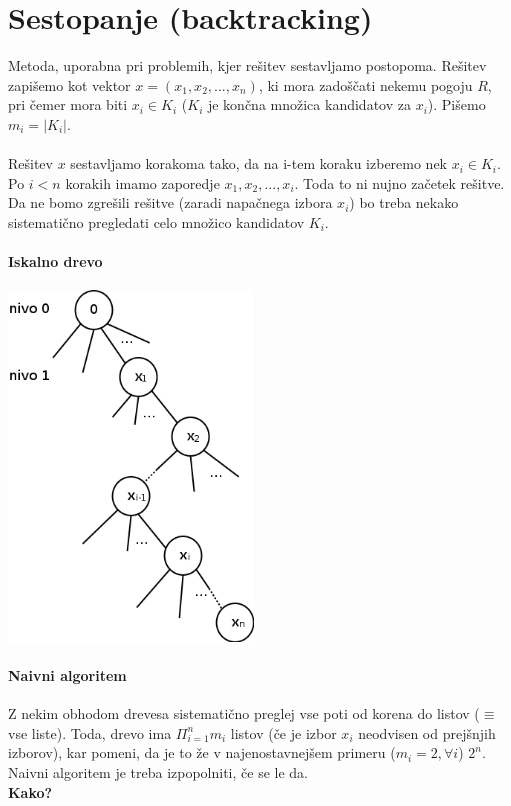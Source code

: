 \documentclass[a4paper,10pt]{article}
\begin{document}
\section{Sestopanje (backtracking)}
Metoda, uporabna pri problemih, kjer re\v sitev sestavljamo postopoma. Re\v sitev zapi\v semo kot vektor $x = (x_1, x_2,..., x_n)$, ki mora zado\v s\v cati nekemu pogoju $R$, pri \v cemer mora biti $x_i \in K_i$ ($K_i$ je kon\v cna mno\v zica kandidatov za $x_i$). Pi\v semo $m_i = |K_i|$.\\
\\
Re\v sitev $x$ sestavljamo korakoma tako, da na i-tem koraku izberemo nek $x_i \in K_i$. Po $i < n$ korakih imamo zaporedje $x_1, x_2,..., x_i$. Toda to ni nujno za\v cetek re\v sitve. Da ne bomo zgre\v sili re\v sitve (zaradi napa\v cnega izbora $x_i$) bo treba nekako sistemati\v cno pregledati celo mno\v zico kandidatov $K_i$.

\paragraph{Iskalno drevo}
\begin{center}
	\includegraphics[width=6.5cm,height=9.3cm]{Slike/IskalnoDrevo.png}
\end{center}

\paragraph{Naivni algoritem}
Z nekim obhodom drevesa sistemati\v cno preglej vse poti od korena do listov ($\equiv$ vse liste). Toda, drevo ima $\Pi_{i=1}^n m_i$ listov (\v ce je izbor $x_i$ neodvisen od prej\v snjih izborov), kar pomeni, da je to \v ze v najenostavnej\v sem primeru ($m_i = 2, \forall i$) $2^n$.\\
Naivni algoritem je treba izpopolniti, \v ce se le da.\\
\textbf{Kako?}\\
\end{document}
